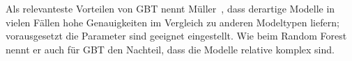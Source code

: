 Als relevanteste Vorteilen von GBT nennt Müller~\cite{Muller.2017}, dass derartige Modelle in vielen Fällen hohe Genauigkeiten im Vergleich zu anderen Modeltypen liefern; vorausgesetzt die Parameter sind geeignet eingestellt. Wie beim Random Forest nennt er auch für GBT den Nachteil, dass die Modelle relative komplex sind.